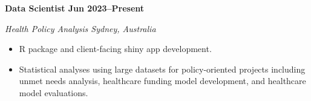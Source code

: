 \textbf{Data Scientist \hfill Jun 2023--Present}\par
\textit{Health Policy Analysis \hfill Sydney, Australia}\par
\begin{itemize}
	\item R package and client-facing shiny app development.
	\item Statistical analyses using large datasets for policy-oriented projects including unmet needs analysis, healthcare funding model development, and healthcare model evaluations.
\end{itemize}\par